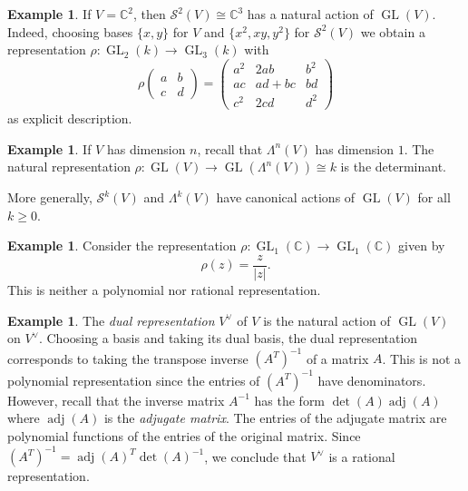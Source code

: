 \documentclass[12pt]{article}
\theoremstyle{plain}
\theoremstyle{definition}
\newtheorem{example}[theorem]{Example}
\theoremstyle{remark}
\numberwithin{equation}{section}
\begin{document}
\begin{example}
If $V = \mathbb{C}^2$, then $\mathcal{S}^2(V) \cong \mathbb{C}^3$
has a natural action of $\operatorname{GL}(V)$.
Indeed, choosing bases $\{x,y\}$ for $V$ and $\{x^2,xy,y^2\}$
for $\mathcal{S}^2(V)$ we obtain a representation
$\rho : \operatorname{GL}_2(k) \to \operatorname{GL}_3(k)$
with
\[
\rho
\begin{pmatrix} a & b \\ c & d \end{pmatrix}
=
\begin{pmatrix}
a^2 & 2ab & b^2\\
ac & ad+bc & bd\\
c^2 & 2cd & d^2
\end{pmatrix} 
\]
as explicit description.
\end{example}

\begin{example}
If $V$ has dimension $n$, recall that $\Lambda^n(V)$ has dimension $1$.
The natural representation
$\rho: \operatorname{GL}(V) \to \operatorname{GL}(\Lambda^n(V)) \cong k$
is the determinant.
\end{example}

More generally, $\mathcal{S}^k(V)$ and $\Lambda^k(V)$
have canonical actions of $\operatorname{GL}(V)$ for all $k \ge 0$.

\begin{example}
Consider the representation
$\rho : \operatorname{GL}_1(\mathbb{C}) \to
\operatorname{GL}_1(\mathbb{C})$
given by
\[
\rho(z) = \frac{z}{|z|} .
\]
This is neither a polynomial nor rational representation.
\end{example}

\begin{example}
The \emph{dual representation} $V^\vee$ of $V$ is the natural
action of $\operatorname{GL}(V)$ on $V^\vee$.
Choosing a basis and taking its dual basis,
the dual representation corresponds to taking the transpose inverse
$(A^T)^{-1}$
of a matrix $A$.
This is not a polynomial representation since the entries of $(A^T)^{-1}$ have
denominators.
However, recall that the inverse matrix $A^{-1}$ has the form
$\det(A)\operatorname{adj}(A)$ where
$\operatorname{adj}(A)$ is the \emph{adjugate matrix}.
The entries of the adjugate matrix are polynomial functions of the
entries of the original matrix.
Since $(A^T)^{-1}=\operatorname{adj}(A)^T \det(A)^{-1}$,
we conclude that $V^\vee$ is a rational representation.
\end{example}
\end{document}
